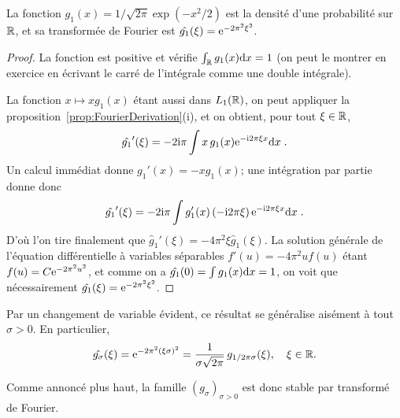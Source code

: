 \begin{lemma}\label{lem:gaussenneTF}
La fonction  $g_1(x)= 1 / \sqrt{2\pi} \exp( -x^2/2)$ est la densit{\'e} d'une probabilit{\'e} sur $\mathbb{R}$, et sa transform{\'e}e de Fourier
est $\hat{g_1}(\xi)= \mathrm{e}^{- 2 \pi^2 \xi^2}$.
\end{lemma}
\begin{proof}
La fonction  est positive et v{\'e}rifie  $\int_{\mathbb{R}} g_1(x) \mathrm{d} x= 1$ (on peut le montrer en exercice en {\'e}crivant le carr{\'e} de
l'int{\'e}grale comme une double int{\'e}grale).

La fonction $x\mapsto xg_1(x)$ {\'e}tant aussi dans $L_1(\mathbb{R})$, on peut appliquer la
proposition~\ref{prop:FourierDerivation}(i), et on obtient, pour tout $\xi\in\mathbb{R}$,
$$
\hat{g_1}'(\xi) = - 2\mathrm{i} \pi \int x \,g_1(x) \mathrm{e}^{- \mathrm{i} 2 \pi \xi x} \mathrm{d} x \;.
$$
Un calcul imm{\'e}diat donne $g_1'(x)= -xg_1(x)$; une int{\'e}gration par partie donne donc
$$
\hat{g_1}'(\xi) = - 2\mathrm{i} \pi  \int g_1'(x) \,(- \mathrm{i} 2 \pi \xi)\,\mathrm{e}^{- \mathrm{i} 2 \pi \xi x} \mathrm{d} x \;.
$$
D'o{\`u} l'on tire finalement que $\hat{g}_1'(\xi) = - 4 \pi^2 \xi \hat{g}_1(\xi)$.
La solution g{\'e}n{\'e}rale de l'{\'e}quation diff{\'e}rentielle {\`a} variables s{\'e}parables  $f'(u)= - 4 \pi^2 u f(u)$
{\'e}tant $f(u) = C \mathrm{e}^{- 2 \pi^2 u^2}$, et comme on a  $\hat{g_1}(0) = \int g_1(x) \mathrm{d} x = 1$,
on voit que n{\'e}cessairement $\hat{g_1}(\xi)= \mathrm{e}^{-2 \pi^2 \xi^2}$.
\end{proof}

Par un changement de variable {\'e}vident, ce r{\'e}sultat se g{\'e}n{\'e}ralise ais{\'e}ment {\`a} tout $\sigma>0$. En particulier,
\begin{equation}\label{eq:gaussienneTF}
\hat{g_\sigma}(\xi) =  \mathrm{e}^{-2 \pi^2 (\xi\sigma)^2} = \frac1{\sigma\sqrt{2\pi}}\,g_{1/2\pi\sigma}(\xi),\quad\xi\in\mathbb{R}.
\end{equation}

Comme annonc\'e plus haut, la famille $(g_\sigma)_{\sigma>0}$ est donc stable par
transform{\'e} de Fourier.
